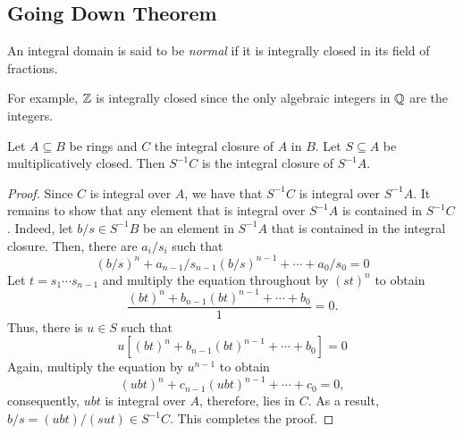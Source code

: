 \subsection{Going Down Theorem}

\begin{definition}
    An integral domain is said to be \textit{normal} if it is integrally closed in its field of fractions.
\end{definition}

For example, $\mathbb{Z}$ is integrally closed since the only algebraic integers in $\mathbb{Q}$ are the integers.

\begin{lemma}
    Let $A\subseteq B$ be rings and $C$ the integral closure of $A$ in $B$. Let $S\subseteq A$ be multiplicatively closed. Then $S^{-1}C$ is the integral closure of $S^{-1}A$.
\end{lemma}
\begin{proof}
    Since $C$ is integral over $A$, we have that $S^{-1}C$ is integral over $S^{-1}A$. It remains to show that any element that is integral over $S^{-1}A$ is contained in $S^{-1}C$. Indeed, let $b/s\in S^{-1}B$ be an element in $S^{-1}A$ that is contained in the integral closure. Then, there are $a_i/s_i$ such that 
    \begin{equation*}
        (b/s)^n + a_{n - 1}/s_{n - 1}(b/s)^{n - 1} + \cdots + a_0/s_0 = 0
    \end{equation*}
    Let $t = s_1\cdots s_{n - 1}$ and multiply the equation throughout by $(st)^n$ to obtain 
    \begin{equation*}
        \frac{(bt)^n + b_{n - 1}(bt)^{n - 1} + \cdots + b_0}{1} = 0.
    \end{equation*}
    Thus, there is $u\in S$ such that 
    \begin{equation*}
        u\left[(bt)^n + b_{n - 1}(bt)^{n - 1} + \cdots + b_0\right] = 0
    \end{equation*}
    Again, multiply the equation by $u^{n - 1}$ to obtain 
    \begin{equation*}
        (ubt)^n + c_{n - 1}(ubt)^{n - 1} + \cdots + c_0 = 0,
    \end{equation*}
    consequently, $ubt$ is integral over $A$, therefore, lies in $C$. As a result, $b/s = (ubt)/(sut)\in S^{-1}C$. This completes the proof.
\end{proof}

